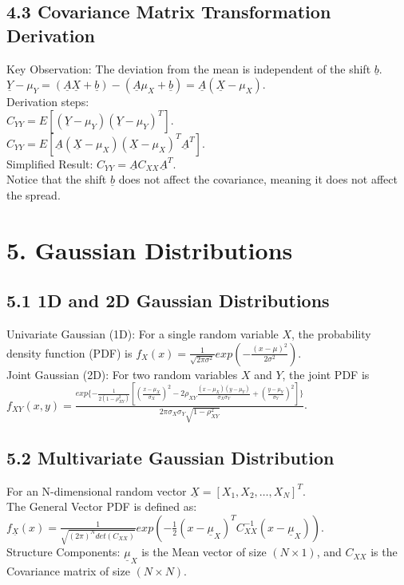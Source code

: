 \documentclass[12pt]{article}
\begin{document}
\subsection*{4.3 Covariance Matrix Transformation Derivation}
Key Observation: The deviation from the mean is independent of the shift $\underline{b}$. \\
$\underline{Y}-\mu_{Y}=(\underline{A}\underline{X}+\underline{b})-(\underline{A}\mu_{X}+\underline{b})=\underline{A}(\underline{X}-\mu_{X})$. \\
Derivation steps: \\
$C_{YY}=E[(\underline{Y}-\mu_{Y})(\underline{Y}-\mu_{Y})^{T}]$. \\
$C_{YY}=E[\underline{A}(\underline{X}-\mu_{X})(\underline{X}-\mu_{X})^{T}\underline{A}^{T}]$. \\
Simplified Result: $C_{YY}=\underline{A}C_{XX}\underline{A}^{T}$. \\
Notice that the shift $\underline{b}$ does not affect the covariance, meaning it does not affect the spread.

\section*{5. Gaussian Distributions}
\subsection*{5.1 1D and 2D Gaussian Distributions}
Univariate Gaussian (1D): For a single random variable $X$, the probability density function (PDF) is $f_{X}(x)=\frac{1}{\sqrt{2\pi\sigma^{2}}}exp(-\frac{(x-\mu)^{2}}{2\sigma^{2}})$. \\
Joint Gaussian (2D): For two random variables $X$ and $Y$, the joint PDF is $f_{XY}(x,y)=\frac{exp\{-\frac{1}{2(1-\rho_{XY}^{2})}[(\frac{x-\mu_{X}}{\sigma_{X}})^{2}-2\rho_{XY}\frac{(x-\mu_{X})(y-\mu_{Y})}{\sigma_{X}\sigma_{Y}}+(\frac{y-\mu_{Y}}{\sigma_{Y}})^{2}]\}}{2\pi\sigma_{X}\sigma_{Y}\sqrt{1-\rho_{XY}^{2}}}$.

\subsection*{5.2 Multivariate Gaussian Distribution}
For an N-dimensional random vector $\underline{X}=[X_{1}, X_{2}, \dots, X_{N}]^{T}$. \\
The General Vector PDF is defined as: $f_{\underline{X}}(x)=\frac{1}{\sqrt{(2\pi)^{N}det(C_{XX})}}exp(-\frac{1}{2}(x-\underline{\mu}_{X})^{T}C_{XX}^{-1}(x-\underline{\mu}_{X}))$. \\
Structure Components: $\underline{\mu}_{X}$ is the Mean vector of size $(N \times 1)$, and $C_{XX}$ is the Covariance matrix of size $(N \times N)$.
\end{document}

